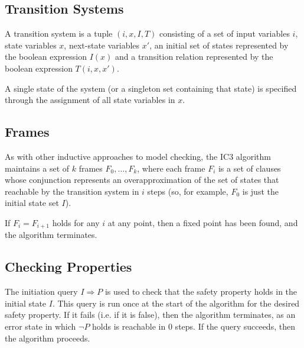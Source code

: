 \documentclass[12pt,a4paper,twoside,openright]{report}
\begin{document}
\begin{algorithm}[H]
\DontPrintSemicolon
{}
\end{algorithm}
\subsection{Transition Systems}
A transition system is a tuple $(i,x,I,T)$ consisting of a set of input
variables $i$, state variables $x$, next-state variables $x'$, an initial
set of states represented by the boolean expression $I(x)$ and
a transition relation represented by the boolean expression $T(i,x,x')$.

A single state of the system (or a singleton set containing that state) is
specified through the assignment
of all state variables in $x$.

\subsection{Frames}
As with other inductive approaches to model checking,
the IC3 algorithm maintains a set of $k$ frames $F_0,\ldots,F_k$, where
each frame $F_i$ is a set of clauses whose conjunction represents an
overapproximation of the set of states that reachable by the transition
system in $i$ steps
(so, for example, $F_0$ is just the initial state set $I$).

If $F_i = F_{i + 1}$ holds for any $i$ at any point, then a fixed point has
been found, and the algorithm terminates.

\subsection{Checking Properties}
The initiation query $I \Rightarrow P$ is used to check that the safety
property holds in the initial state $I$.
This query is run once at the start of
the algorithm for the desired safety property. If it fails (i.e. if it
is false), then the algorithm terminates, as an error state in
which $\neg P$ holds is reachable in 0 steps. If the query succeeds,
then the algorithm proceeds.
\end{document}
